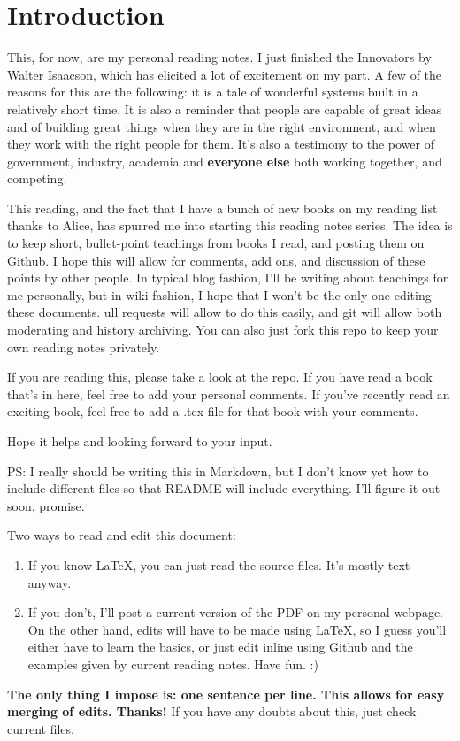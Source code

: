 \section{Introduction}

This, for now, are my personal reading notes.
I just finished the Innovators by Walter Isaacson, which has elicited a lot of excitement on my part.
A few of the reasons for this are the following: it is a tale of wonderful systems built in a relatively short time.
It is also a reminder that people are capable of great ideas and of building great things when they are in the right environment, and when they work with the right people for them.
It's also a testimony to the power of government, industry, academia and \textbf{everyone else} both working together, and competing.

This reading, and the fact that I have a bunch of new books on my reading list thanks to Alice, has spurred me into starting this reading notes series.
The idea is to keep short, bullet-point teachings from books I read, and posting them on Github.
I hope this will allow for comments, add ons, and discussion of these points by other people. In typical blog fashion, I'll be writing about teachings for me personally, but in wiki fashion, I hope that I won't be the only one editing these documents. 
ull requests will allow to do this easily, and git will allow both moderating and history archiving.
You can also just fork this repo to keep your own reading notes privately.

If you are reading this, please take a look at the repo.
If you have read a book that's in here, feel free to add your personal comments.
If you've recently read an exciting book, feel free to add a .tex file for that book with your comments.

Hope it helps and looking forward to your input.

PS: I really should be writing this in Markdown, but I don't know yet how to include different files so that README will include everything.
I'll figure it out soon, promise.

Two ways to read and edit this document:

\begin{enumerate}
    \item If you know LaTeX, you can just read the source files.
    It's mostly text anyway.
    \item If you don't, I'll post a current version of the PDF on my personal webpage.
    On the other hand, edits will have to be made using LaTeX, so I guess you'll either have to learn the basics, or just edit inline using Github and the examples given by current reading notes.
    Have fun. :)
\end{enumerate}

\textbf{The only thing I impose is: one sentence per line. This allows for easy merging of edits. Thanks!} If you have any doubts about this, just check current files.
